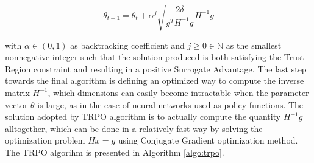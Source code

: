                 \[ \theta_{t+1} = \theta_{t} + \alpha^{j} \sqrt{\frac{2\delta}{g^{T}H^{-1}g}} H^{-1}g\]
                
                with $\alpha \in (0, 1)$ as backtracking coefficient and $j \geq 0 \in \mathbb{N}$ as the smallest nonnegative integer such that the solution produced is both satisfying the Trust Region constraint and resulting in a positive Surrogate Advantage. \newline
                The last step towards the final algorithm is defining an optimized way to compute the inverse matrix $H^{-1}$, which dimensions can easily become intractable when the parameter vector $\theta$ is large, as in the case of neural networks used as policy functions. The solution adopted by TRPO algorithm is to actually compute the quantity $H^{-1}g$ alltogether, which can be done in a relatively fast way by solving the optimization problem $Hx = g$ using Conjugate Gradient optimization method. The TRPO algorihm is presented in Algorithm \ref{algo:trpo}.
                
